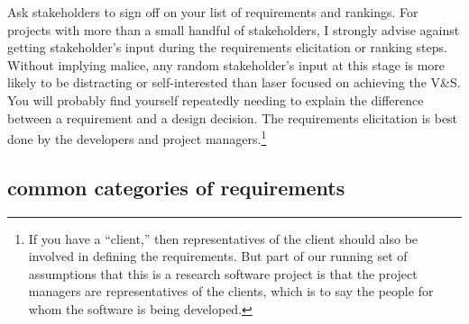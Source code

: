 \documentclass[12pt,oneside]{book}
\begin{document}
Ask stakeholders to sign off on your list of requirements and rankings. For projects with more than a small handful of stakeholders, I strongly advise against getting stakeholder's input during the requirements elicitation or ranking steps. Without implying malice, any random stakeholder's input at this stage is more likely to be distracting or self-interested than laser focused on achieving the V\&S. You will probably find yourself repeatedly needing to explain the difference between a requirement and a design decision. The requirements elicitation is best done by the developers and project managers.\footnote{If you have a ``client,'' then representatives of the client should also be involved in defining the requirements. But part of our running set of assumptions that this is a research software project is that the project managers are representatives of the clients, which is to say the people for whom the software is being developed.}

\subsection*{common categories of requirements}
\label{scrivauto:24}
\end{document}
